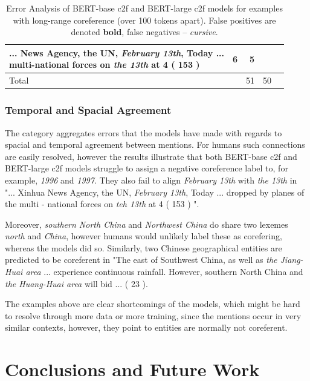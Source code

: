 \documentclass[11pt]{article}
\begin{document}
\begin{table}[b!]
\begin{tabular*}{\textwidth}{@{\extracolsep{\fill}} l *{4}{d{1.2}} }
{{... News Agency, the UN, \textit{February 13th}, Today ... \\  multi-national forces on \textit{the 13th} at 4 ( 153 ) 
}} & 6 & 5 \\
\midrule
Total &  & 51 & 50 \\
\bottomrule
\end{tabular*}
\caption{Error Analysis of BERT-base c2f and BERT-large c2f models for examples with long-range coreference (over 100 tokens apart). False positives are denoted \textbf{bold}, false negatives -- \textit{cursive}. }
\label{table:error-over-100}
\end{table}

\subsubsection{Temporal and Spacial Agreement}
The category aggregates errors that the models have made with regards to spacial and temporal agreement between mentions. For humans such connections are easily resolved, however the results illustrate that both BERT-base c2f and BERT-large c2f models struggle to assign a negative coreference label to, for example, \textit{1996} and \textit{1997}. They also fail to align \textit{February 13th} with \textit{the 13th} in "... Xinhua News Agency, the UN, \textit{February 13th}, Today ... dropped by planes of the multi - national forces on \textit{teh 13th} at 4 ( 153 ) ". 

Moreover, \textit{southern North China} and \textit{Northwest China} do share two lexemes \textit{north} and \textit{China}, however humans would unlikely label these as corefering, whereas the models did so. Similarly, two Chinese geographical entities are predicted to be coreferent in "The east of Southwest China, as well as \textit{the Jiang-Huai area} ... experience continuous rainfall. However, southern North China and \textit{the Huang-Huai area} will bid ... ( 23 ). 

The examples above are clear shortcomings of the models, which might be hard to resolve through more data or more training, since the mentions occur in very similar contexts, however, they point to entities are normally not coreferent. 


\section{Conclusions and Future Work}
\end{document}
